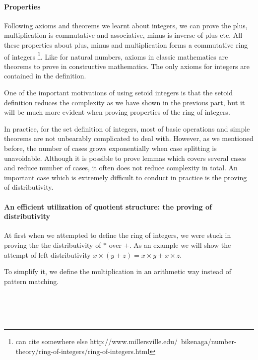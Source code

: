 \paragraph{Properties}

Following axioms and theorems we learnt about integers, we can prove
the plus, multiplication is commutative and associative, minus is
inverse of plus etc. All these properties about plus, minus and
multiplication forms a commutative ring of integers \footnote{can cite
somewhere else http://www.millersville.edu/~bikenaga/number-theory/ring-of-integers/ring-of-integers.html}.
Like for natural numbers, axioms in classic mathematics are theorems
to prove in constructive mathematics. The only axioms for integers are
contained in the definition.

One of the important motivations of using setoid integers is that
the setoid definition reduces the complexity as we have shown in the
previous part, but it
will be much more evident when proving properties of the ring of integers.

In practice, for the set definition of integers, most of basic operations and simple theorems are not unbearably
complicated to deal with. However, as we mentioned before, the number of
cases grows exponentially when case splitting is unavoidable.
Although it is
possible to prove lemmas which covers several cases and reduce number
of cases, it often does not reduce complexity in total.
 An important case which is extremely difficult to conduct in practice is the proving of distributivity.

\paragraph{An efficient utilization of quotient structure: the
  proving of distributivity}

At first when we attempted to define the ring of integers, we were
stuck in proving the the distributivity of $*$ over $+$. As an example
we will show the attempt of left
distributivity $ x \times (y + z) = x \times y + x \times z$.

To simplify it, we define the multiplication in an arithmetic way
instead of pattern matching.

\begin{code}
\\
\> \AgdaSymbol{:}     \<%
\\
\>   \AgdaSymbol{=}
  
   
   
 \<%
\\
\end{code}

